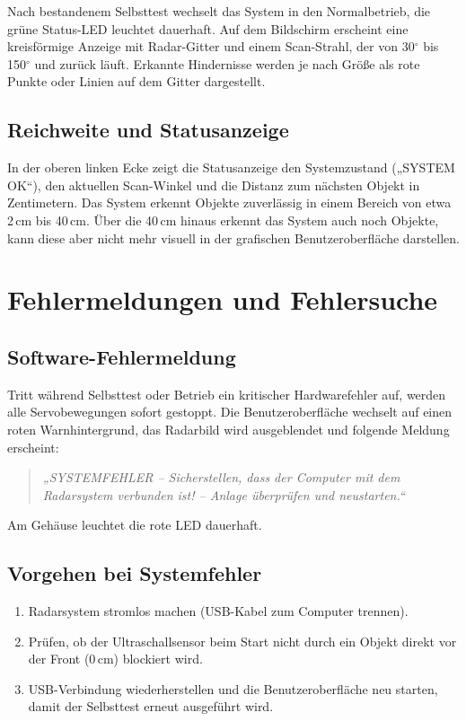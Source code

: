 \documentclass[a4paper,11pt]{article}
\begin{document}
	Nach bestandenem Selbsttest wechselt das System in den Normalbetrieb, die grüne Status-LED leuchtet dauerhaft. 
	Auf dem Bildschirm erscheint eine kreisförmige Anzeige mit Radar-Gitter und einem Scan-Strahl, der von 30\(^\circ\) bis 150\(^\circ\) und zurück läuft. 
	Erkannte Hindernisse werden je nach Größe als rote Punkte oder Linien auf dem Gitter dargestellt. 
	
	\subsection{Reichweite und Statusanzeige}
	
	In der oberen linken Ecke zeigt die Statusanzeige den Systemzustand („SYSTEM OK“), den aktuellen Scan-Winkel und die Distanz zum nächsten Objekt in Zentimetern. 
	Das System erkennt Objekte zuverlässig in einem Bereich von etwa 2\,cm bis 40\,cm. Über die 40\,cm hinaus erkennt das System auch noch Objekte, kann diese aber nicht mehr visuell in der grafischen Benutzeroberfläche darstellen.
	
	\section{Fehlermeldungen und Fehlersuche}
	
	\subsection{Software-Fehlermeldung}
	
	Tritt während Selbsttest oder Betrieb ein kritischer Hardwarefehler auf, werden alle Servobewegungen sofort gestoppt. 
	Die Benutzeroberfläche wechselt auf einen roten Warnhintergrund, das Radarbild wird ausgeblendet und folgende Meldung erscheint: 
	
	\begin{quote}
		\textit{„SYSTEMFEHLER – Sicherstellen, dass der Computer mit dem Radarsystem verbunden ist! – Anlage überprüfen und neustarten.“}
	\end{quote}
	
	Am Gehäuse leuchtet die rote LED dauerhaft. 
	
	\subsection{Vorgehen bei Systemfehler}
	
	\begin{enumerate}
		\item Radarsystem stromlos machen (USB-Kabel zum Computer trennen). 
		\item Prüfen, ob der Ultraschallsensor beim Start nicht durch ein Objekt direkt vor der Front (0\,cm) blockiert wird. 
		\item USB-Verbindung wiederherstellen und die Benutzeroberfläche neu starten, damit der Selbsttest erneut ausgeführt wird. 
	\end{enumerate}
	
\end{document}
